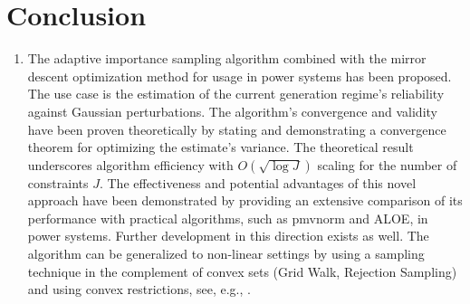 \section*{Conclusion}
\begin{enumerate}
    \item The adaptive importance sampling algorithm combined with the mirror descent optimization method for usage in power systems has been proposed. The use case is the estimation of the current generation regime's reliability against Gaussian perturbations.
        The algorithm's convergence and validity have been proven theoretically by stating and demonstrating a convergence theorem for optimizing the estimate's variance. The theoretical result underscores algorithm efficiency with $O\left( \sqrt{\log J} \right)$ scaling for the number of constraints $J$.
        The effectiveness and potential advantages of this novel approach have been demonstrated by providing an extensive comparison of its performance with practical algorithms, such as pmvnorm and ALOE, in power systems. Further development in this direction exists as well. The algorithm can be generalized to non-linear settings by using a sampling technique in the complement of convex sets (Grid Walk, Rejection Sampling) and using convex restrictions, see, e.g., \cite{lee2019convex}.
        

\end{enumerate}
